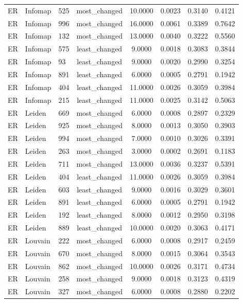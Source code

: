 \begin{longtable}{lllccccc}
ER & Infomap & 525 & most\_changed & 10.0000 & 0.0023 & 0.3140 & 0.4121 \\
ER & Infomap & 996 & most\_changed & 16.0000 & 0.0061 & 0.3389 & 0.7642 \\
ER & Infomap & 132 & most\_changed & 13.0000 & 0.0040 & 0.3222 & 0.5560 \\
ER & Infomap & 575 & least\_changed & 9.0000 & 0.0018 & 0.3083 & 0.3844 \\
ER & Infomap & 93 & least\_changed & 9.0000 & 0.0020 & 0.2990 & 0.3254 \\
ER & Infomap & 891 & least\_changed & 6.0000 & 0.0005 & 0.2791 & 0.1942 \\
ER & Infomap & 404 & least\_changed & 11.0000 & 0.0026 & 0.3059 & 0.3984 \\
ER & Infomap & 215 & least\_changed & 11.0000 & 0.0025 & 0.3142 & 0.5063 \\
ER & Leiden & 669 & most\_changed & 6.0000 & 0.0008 & 0.2897 & 0.2329 \\
ER & Leiden & 925 & most\_changed & 8.0000 & 0.0013 & 0.3050 & 0.3903 \\
ER & Leiden & 994 & most\_changed & 7.0000 & 0.0010 & 0.3026 & 0.3391 \\
ER & Leiden & 263 & most\_changed & 3.0000 & 0.0002 & 0.2691 & 0.1183 \\
ER & Leiden & 711 & most\_changed & 13.0000 & 0.0036 & 0.3237 & 0.5391 \\
ER & Leiden & 404 & least\_changed & 11.0000 & 0.0026 & 0.3059 & 0.3984 \\
ER & Leiden & 603 & least\_changed & 9.0000 & 0.0016 & 0.3029 & 0.3601 \\
ER & Leiden & 891 & least\_changed & 6.0000 & 0.0005 & 0.2791 & 0.1942 \\
ER & Leiden & 192 & least\_changed & 8.0000 & 0.0012 & 0.2950 & 0.3198 \\
ER & Leiden & 889 & least\_changed & 10.0000 & 0.0020 & 0.3063 & 0.4171 \\
ER & Louvain & 222 & most\_changed & 6.0000 & 0.0008 & 0.2917 & 0.2459 \\
ER & Louvain & 670 & most\_changed & 8.0000 & 0.0015 & 0.3064 & 0.3543 \\
ER & Louvain & 862 & most\_changed & 10.0000 & 0.0026 & 0.3171 & 0.4734 \\
ER & Louvain & 258 & most\_changed & 9.0000 & 0.0018 & 0.3123 & 0.4319 \\
ER & Louvain & 327 & most\_changed & 6.0000 & 0.0008 & 0.2880 & 0.2202 \\

\end{longtable}
